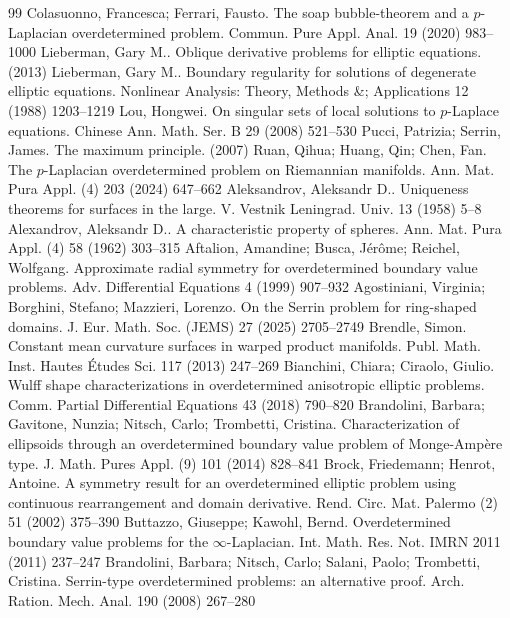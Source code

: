 \documentclass[10pt,a4paper]{amsart}
\numberwithin{equation}{section}
\begin{document}
\begin{thebibliography}{99}
 Colasuonno, Francesca; Ferrari, Fausto. The soap bubble-theorem and a {$p$}-{L}aplacian overdetermined problem. Commun. Pure Appl. Anal. 19 (2020) 983--1000
 Lieberman, Gary M.. Oblique derivative problems for elliptic equations. (2013)
 Lieberman, Gary M.. Boundary regularity for solutions of degenerate elliptic equations. Nonlinear Analysis: Theory, Methods \&; Applications 12 (1988) 1203–1219
 Lou, Hongwei. On singular sets of local solutions to {$p$}-{L}aplace equations. Chinese Ann. Math. Ser. B 29 (2008) 521--530
 Pucci, Patrizia; Serrin, James. The maximum principle. (2007)
 Ruan, Qihua; Huang, Qin; Chen, Fan. The {$p$}-{L}aplacian overdetermined problem on {R}iemannian manifolds. Ann. Mat. Pura Appl. (4) 203 (2024) 647--662
 Aleksandrov, Aleksandr D.. Uniqueness theorems for surfaces in the large. V. Vestnik Leningrad. Univ. 13 (1958) 5--8
 Alexandrov, Aleksandr D.. A characteristic property of spheres. Ann. Mat. Pura Appl. (4) 58 (1962) 303--315
 Aftalion, Amandine; Busca, J\'er\^ome; Reichel, Wolfgang. Approximate radial symmetry for overdetermined boundary value problems. Adv. Differential Equations 4 (1999) 907--932
 Agostiniani, Virginia; Borghini, Stefano; Mazzieri, Lorenzo. On the {S}errin problem for ring-shaped domains. J. Eur. Math. Soc. (JEMS) 27 (2025) 2705--2749
 Brendle, Simon. Constant mean curvature surfaces in warped product manifolds. Publ. Math. Inst. Hautes \'Etudes Sci. 117 (2013) 247--269
 Bianchini, Chiara; Ciraolo, Giulio. Wulff shape characterizations in overdetermined anisotropic elliptic problems. Comm. Partial Differential Equations 43 (2018) 790--820
 Brandolini, Barbara; Gavitone, Nunzia; Nitsch, Carlo; Trombetti, Cristina. Characterization of ellipsoids through an overdetermined boundary value problem of Monge-Amp\`ere type. J. Math. Pures Appl. (9) 101 (2014) 828--841
 Brock, Friedemann; Henrot, Antoine. A symmetry result for an overdetermined elliptic problem using continuous rearrangement and domain derivative. Rend. Circ. Mat. Palermo (2) 51 (2002) 375--390
 Buttazzo, Giuseppe; Kawohl, Bernd. Overdetermined boundary value problems for the {$\infty$}-{L}aplacian. Int. Math. Res. Not. IMRN 2011 (2011) 237--247
 Brandolini, Barbara; Nitsch, Carlo; Salani, Paolo; Trombetti, Cristina. Serrin-type overdetermined problems: an alternative proof. Arch. Ration. Mech. Anal. 190 (2008) 267--280

\end{thebibliography}
\end{document}
